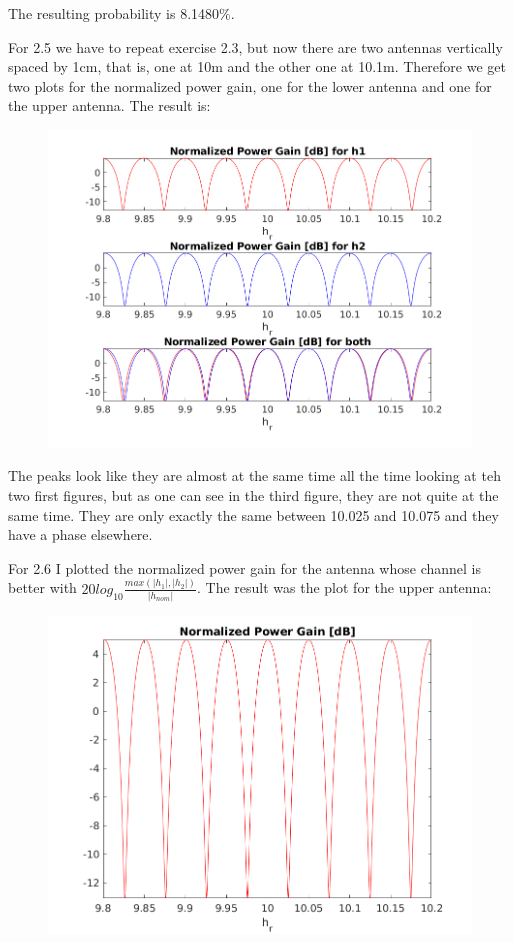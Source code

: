 \documentclass[a4paper,11pt]{article}
\begin{document}
\bigskip

The resulting probability is 8.1480\%.

\bigskip

For 2.5 we have to repeat exercise 2.3, but now there are two antennas
vertically spaced by 1cm, that is, one at 10m and the other one at 10.1m.
Therefore we get two plots for the normalized power gain, one for the lower
antenna and one for the upper antenna. The result is:

\begin{figure}[!ht]
	\centering
	\includegraphics[scale = 1.05]{images/2_5.png}
\end{figure}

The peaks look like they are almost at the same time all the time looking at
teh two first figures, but as one can see in the third figure, they are not
quite at the same time. They are only exactly the same between 10.025 and 10.075
and they have a phase elsewhere.

\newpage

For 2.6 I plotted the normalized power gain for the antenna whose channel is
better with $20log_{10}\displaystyle\frac{max(|h_1|,|h_2|)}{|h_{nom}|}$. The
result was the plot for the upper antenna:

\begin{figure}[!ht]
	\centering
	\includegraphics[scale = 0.7]{images/2_6.png}
\end{figure}
\end{document}
